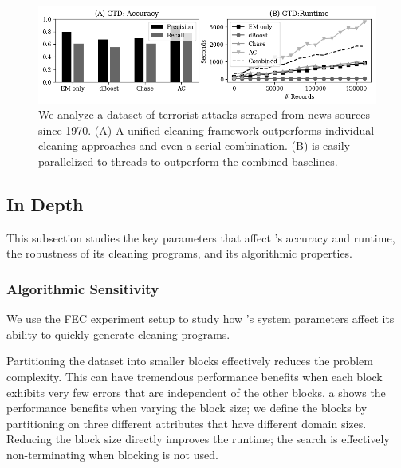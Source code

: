 
\begin{figure}
    \centering
    \includegraphics[width=\columnwidth]{exp/exp7.png}
    \caption{\small We analyze a dataset of terrorist attacks scraped from news sources since 1970. (A) A unified cleaning framework outperforms individual cleaning approaches and even a serial combination.  (B) \sys is easily parallelized to  threads to outperform the combined baselines.  \label{exp7a}}
\end{figure}

\subsection{\sys In Depth}
This subsection studies the key parameters that affect \sys's accuracy and runtime, the robustness of its cleaning programs, and its algorithmic properties.

\subsubsection{Algorithmic Sensitivity}
We use the FEC experiment setup to study how \sys's system parameters affect its ability to quickly generate cleaning programs. 

 Partitioning the dataset into smaller blocks effectively reduces the problem complexity.  This can have tremendous performance benefits when each block exhibits very few errors that are independent of the other blocks.  a shows the performance benefits when varying the block size; we define the blocks by partitioning on three different attributes that have different domain sizes.  Reducing the block size directly improves the runtime; the search is effectively non-terminating when blocking is not used.    

